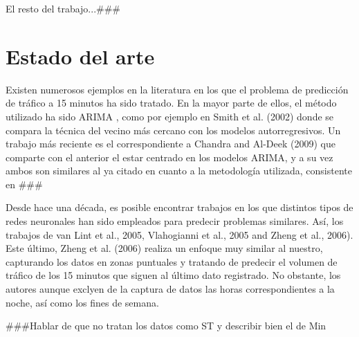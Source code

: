 \documentclass[twocolumn]{maeb2015}
\begin{document}
El resto del trabajo...###



\section{Estado del arte}
Existen numerosos ejemplos en la literatura en los que el problema de predicción de tráfico a 15 minutos ha sido tratado. En la mayor parte de ellos, el método utilizado ha sido ARIMA \cite{ARIMA}, como por ejemplo en Smith et al. (2002) donde se compara la técnica del vecino más cercano con los modelos autorregresivos. Un trabajo más reciente es el correspondiente a Chandra and Al-Deek (2009) que comparte con el anterior el estar centrado en los modelos ARIMA, y a su vez ambos son similares al ya citado \cite{Min2011606} en cuanto a la metodología utilizada, consistente en ###

Desde hace una década, es posible encontrar trabajos en los que distintos tipos de redes neuronales han sido empleados para predecir problemas similares. Así, los trabajos de van Lint et al., 2005, Vlahogianni et al., 2005 and Zheng et al., 2006). Este último,  Zheng et al. (2006) realiza un enfoque muy similar al nuestro, capturando los datos en zonas puntuales y tratando de predecir el volumen de tráfico de los 15 minutos que siguen al último dato registrado. No obstante, los autores aunque exclyen de la captura de datos las horas correspondientes a la noche, así como los fines de semana.

###Hablar de que no tratan los datos como ST y describir bien el de Min
\end{document}
